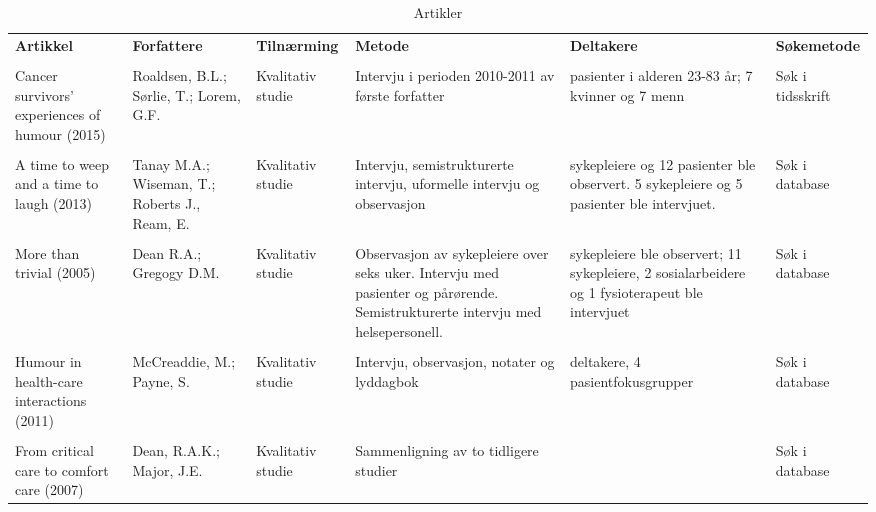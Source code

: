\begin{landscape}
  \begin{table}
    \begin{tabularx}{\paperwidth}{
        >{\raggedright\arraybackslash}X
        >{\raggedright\arraybackslash}X
        l
        >{\raggedright\arraybackslash}X
        >{\raggedright\arraybackslash}X
        l}
      \textbf{Artikkel} &
      \textbf{Forfattere} &
      \textbf{Tilnærming} &
      \textbf{Metode} &
      \textbf{Deltakere} &
      \textbf{Søkemetode} \\
      \\
      Cancer survivors’ experiences of humour (2015) &
      Roaldsen, B.L.; S{\o}rlie, T.; Lorem, G.F. &
      Kvalitativ studie &
      Intervju i perioden 2010-2011 av første forfatter &
      14 pasienter i alderen 23-83 år; 7 kvinner og 7 menn &
      Søk i tidsskrift
      \\ \\
      A time to weep and a time to laugh (2013) &
      Tanay M.A.; Wiseman, T.; Roberts J., Ream, E. &
      Kvalitativ studie &
      Intervju, semistrukturerte intervju, uformelle intervju og observasjon &
      9 sykepleiere og 12 pasienter ble observert. 5 sykepleiere og 5 pasienter ble intervjuet. &
      Søk i database
      \\ \\
      More than trivial (2005) &
      Dean R.A.; Gregogy D.M. &
      Kvalitativ studie &
      Observasjon av sykepleiere over seks uker. Intervju med
      pasienter og pårørende. Semistrukturerte intervju med helsepersonell. &
      6 sykepleiere ble observert; 11 sykepleiere, 2
      sosialarbeidere og 1 fysioterapeut ble intervjuet &
      Søk i database
      \\ \\
      Humour in health-care interactions (2011) &
      McCreaddie, M.; Payne, S. &
      Kvalitativ studie &
      Intervju, observasjon, notater og lyddagbok &
      32 deltakere, 4 pasientfokusgrupper &
      Søk i database
      \\ \\
      From critical care to comfort care (2007) &
      Dean, R.A.K.; Major, J.E. &
      Kvalitativ studie &
      Sammenligning av to tidligere studier &
      &
      Søk i database
    \end{tabularx}
    \label{tabell.artikler}
    \caption{Artikler}
  \end{table}
\end{landscape}
